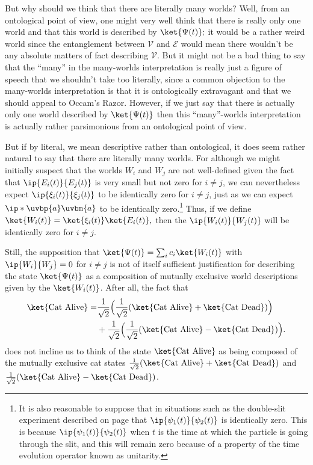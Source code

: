    But why should we think that there are literally many worlds? Well, from an ontological point of view, one might very well think that there is really only one world and that this world is described by $\ket{\Psi(t)};$ it would be a rather weird world since the entanglement between $\mathcal{V}$ and $\mathcal{E}$ would mean there wouldn't be any absolute matters of fact describing $\mathcal{V}$. But it might not be a bad thing to say that the ``many'' in the many-worlds interpretation is really just a figure of speech that we shouldn't take too literally, since a common objection to the many-worlds interpretation is that it is ontologically extravagant and that we should appeal to Occam's Razor. However, if we just say that there is actually only one world described by $\ket{\Psi(t)}$ then this ``many''-worlds interpretation is actually rather parsimonious from an ontological point of view. 
    
    But if by literal, we mean descriptive rather than ontological, it does seem rather natural to say that there are literally many worlds. For although we might initially suspect that the worlds $W_i$ and $W_j$ are not well-defined given the fact that $\ip{E_i(t)}{E_j(t)}$ is very small but not zero for $i\neq j$, we can nevertheless expect $\ip{\xi_i(t)}{\xi_j(t)}$ to be identically zero for $i\neq j$, just as we can expect $\ip*{\uvbp{a}}{\uvbm{a}}$ to be identically zero.\footnote{It is also reasonable to suppose that in situations such as the double-slit experiment described on page \pageref{psi_slit} that $\ip{\psi_1(t)}{\psi_2(t)}$ is identically zero. This is because $\ip{\psi_1(t)}{\psi_2(t)}$ when $t$ is the time at which the particle is going through the slit, and this will remain zero because of a property of the time evolution operator known as unitarity.} Thus, if we define $\ket{W_i(t)}=\ket{\xi_i(t)}\ket{E_i(t)},$ then the $\ip{W_i(t)}{W_j(t)}$ will be identically zero for $i\neq j$. 
    
    Still, the supposition that $\ket{\Psi(t)}= \sum_i c_i\ket{W_i(t)}$  with $\ip{W_i}{W_j}=0$ for $i\neq j$ is not of itself sufficient justification for describing the state $\ket{\Psi(t)}$ as a composition of mutually exclusive world descriptions given by the $\ket{W_i(t)}$. After all, the fact that
    \begin{align*}\ket{\text{Cat Alive}}= &\frac{1}{\sqrt{2}}\Big(\frac{1}{\sqrt{2}}(\ket{\text{Cat Alive}}+\ket{\text{Cat Dead}})\Big)\\&+\frac{1}{\sqrt{2}}\Big( \frac{1}{\sqrt{2}}(\ket{\text{Cat Alive}}-\ket{\text{Cat Dead}})\Big). \end{align*} does not incline us to think of the state $\ket{\text{Cat Alive}}$ as being composed of the mutually exclusive cat states  $\frac{1}{\sqrt{2}}(\ket{\text{Cat Alive}}+\ket{\text{Cat Dead}})$ and $\frac{1}{\sqrt{2}}(\ket{\text{Cat Alive}}-\ket{\text{Cat Dead}})$. 
    
